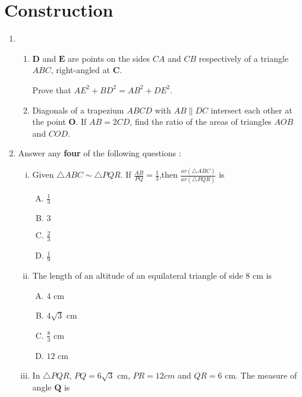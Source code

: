 \documentclass{article}
\let\vec\mathbf
\begin{document}
\section*{\centering Construction}
\begin{enumerate}
    \item 
    \begin{enumerate}
    \item $\vec{D}$ and $\vec{E}$ are points on the sides $CA$ and $CB$ respectively of  a triangle $ABC$, right-angled at $\vec{C}$.
    
    Prove that $AE^2+BD^2=AB^2+DE^2$.
    
    \item Diagonals of a trapezium $ABCD$ with $AB\parallel DC$ intersect each other at the point $\vec{O}$. If $AB=2CD$, find the ratio of the areas of triangles $AOB$ and $COD$.
    \end{enumerate}

    \item Answer any \textbf{four} of the following questions :
      \begin{enumerate}[(i)]
        \item Given $\triangle ABC \sim \triangle PQR$. If $\frac{AB}{PQ}=\frac{1}{3}$,then $\frac{ar(\triangle ABC)}{ar(\triangle PQR)}$ is 
        
        \begin{enumerate}[(A)]
            \item $\frac{1}{3}$
            \item $3$
            \item $\frac{2}{3}$
            \item $\frac{1}{9}$
        \end{enumerate}
        
        \item The length of an altitude of an equilateral triangle of side $8$ cm is
        
          \begin{enumerate}[(A)]
            \item $4$ cm
            \item $4\sqrt{3}$ cm
            \item $\frac{8}{3}$ cm
            \item $12$ cm
        \end{enumerate}
        
        \item In $\triangle PQR$, $PQ=6\sqrt{3}$ cm, $PR=12 cm$ and $QR = 6$ cm. The measure of angle $\vec{Q}$ is
        

\end{enumerate}
\end{enumerate}
\end{document}
